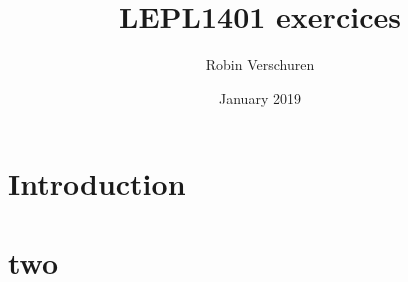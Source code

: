 \documentclass{article}
\title{LEPL1401 exercices}
\author{Robin Verschuren}
\date{January 2019}
\begin{document}
\maketitle
\tableofcontents

\section{Introduction}

\tableofcontents



\section{two}
\end{document}
